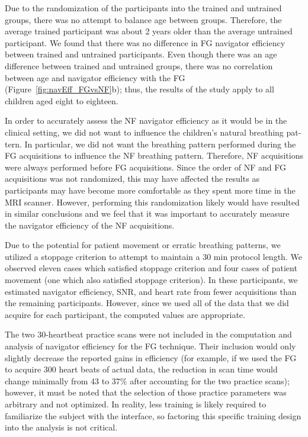 		Due to the randomization of the participants into the trained and untrained groups, there was no attempt to balance age between groups. Therefore, the average trained participant was about 2 years older than the average untrained participant. We found that there was no difference in FG navigator efficiency between trained and untrained participants. Even though there was an age difference between trained and untrained groups, there was no correlation between age and navigator efficiency with the FG (Figure~\ref{fig:navEff_FGvsNF}b); thus, the results of the study apply to all children aged eight to eighteen.
		
		In order to accurately assess the NF navigator efficiency as it would be in the clinical setting, we did not want to influence the children's natural breathing pat- tern. In particular, we did not want the breathing pattern performed during the FG acquisitions to influence the NF breathing pattern. Therefore, NF acquisitions were always performed before FG acquisitions. Since the order of NF and FG acquisitions was not randomized, this may have affected the results as participants may have become more comfortable as they spent more time in the MRI scanner. However, performing this randomization likely would have resulted in similar conclusions and we feel that it was important to accurately measure the navigator efficiency of the NF acquisitions.
		
		Due to the potential for patient movement or erratic breathing patterns, we utilized a stoppage criterion to attempt to maintain a 30 min protocol length. We observed eleven cases which satisfied stoppage criterion and four cases of patient movement (one which also satisfied stoppage criterion). In these participants, we estimated navigator efficiency, SNR, and heart rate from fewer acquisitions than the remaining participants. However, since we used all of the data that we did acquire for each participant, the computed values are appropriate.
		
		The two 30-heartbeat practice scans were not included in the computation and analysis of navigator efficiency for the FG technique. Their inclusion would only slightly decrease the reported gains in efficiency (for example, if we used the FG to acquire 300 heart beats of actual data, the reduction in scan time would change minimally from 43 to 37\% after accounting for the two practice scans); however, it must be noted that the selection of those practice parameters was arbitrary and not optimized. In reality, less training is likely required to familiarize the subject with the interface, so factoring this specific training design into the analysis is not critical.
		
